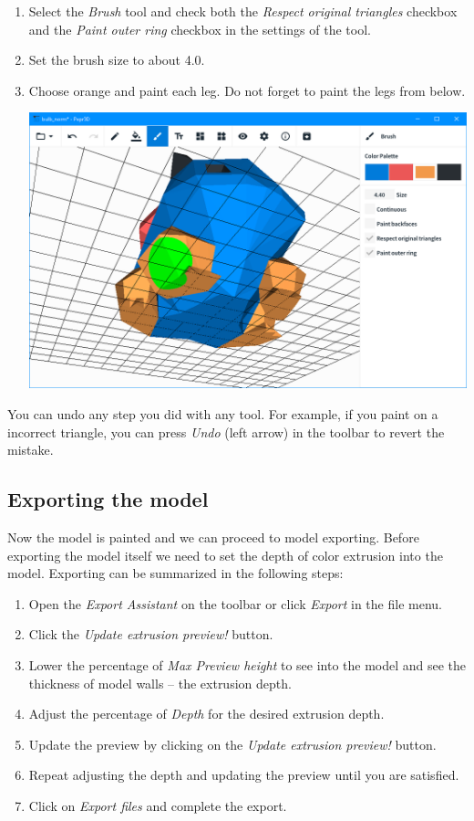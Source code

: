 \begin{enumerate}
\item Select the \textit{Brush} tool and check both the \textit{Respect original triangles} checkbox and the \textit{Paint outer ring} checkbox in the settings of the tool.
\item Set the brush size to about 4.0.
\item Choose orange and paint each leg. Do not forget to paint the legs from below.

\begin{center}
\includegraphics[scale=0.4]{images/bulb_legs.png}
\end{center}

\end{enumerate}


You can undo any step you did with any tool. For example, if you paint on a incorrect triangle, you can press \textit{Undo} (left arrow) in the toolbar to revert the mistake.

\subsection{Exporting the model}
Now the model is painted and we can proceed to model exporting. Before exporting the model itself we need to set the depth of color extrusion into the model. Exporting can be summarized in the following steps:


\begin{enumerate}
\item Open the \textit{Export Assistant} on the toolbar or click \textit{Export} in the file menu.
\item Click the \textit{Update extrusion preview!} button.
\item Lower the percentage of \textit{Max Preview height} to see into the model and see the thickness of model walls -- the extrusion depth.
\item Adjust the percentage of \textit{Depth} for the desired extrusion depth.
\item Update the preview by clicking on the \textit{Update extrusion preview!} button.
\item Repeat adjusting the depth and updating the preview until you are satisfied.
\item Click on \textit{Export files} and complete the export.
\end{enumerate}

